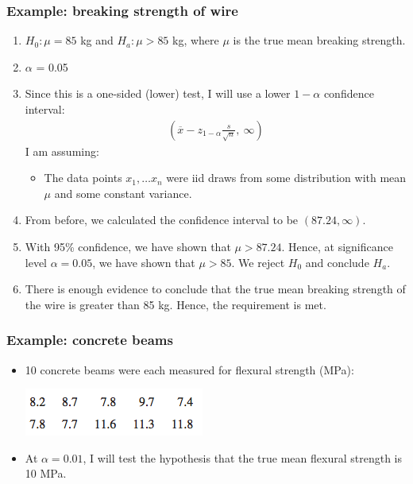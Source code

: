 \documentclass[handout]{beamer}\usepackage[]{graphicx}\usepackage[]{color}
\providecommand{\ov}[1]{\overline{#1}}
\numberwithin{equation}{section}
\begin{document}
\begin{frame}
\frametitle{Example: breaking strength of wire} \scriptsize
\begin{enumerate}[1. ]
\item $H_0: \mu = 85$ kg and $H_a: \mu > 85$ kg, where $\mu$ is the true mean breaking strength.
\pause \item $\alpha$ = 0.05
\pause \item Since this is a one-sided (lower) test, I will use a lower $1 - \alpha$ confidence interval:
\pause \begin{align*}
\left (\ov{x} - z_{1 - \alpha} \frac{s}{\sqrt{n}}, \ \infty \right )
\end{align*}
\pause I am assuming:
\pause \begin{itemize}
\pause \item The data points $x_1, \ldots x_n$ were iid draws from some distribution with mean $\mu$ and some constant variance.
\end{itemize}
\pause \item From before, we calculated the confidence interval to be $(87.24, \infty)$.
\pause \item With 95\% confidence, we have shown that $\mu > 87.24$. Hence, at significance level $\alpha = 0.05$, we have shown that $\mu > 85$. We reject $H_0$ and conclude $H_a$.
\pause \item There is enough evidence to conclude that the true mean breaking strength of the wire is greater than 85 kg. Hence, the requirement is met.
\end{enumerate}
\end{frame}

\begin{frame}
\frametitle{Example: concrete beams}
\begin{itemize}
\item 10 concrete beams were each measured for flexural strength (MPa):
\begin{center}
 \includegraphics{../../fig/fbeams.png}
\end{center}
\item At $\alpha = 0.01$, I will test the hypothesis that the true mean flexural strength is 10 MPa.
\end{itemize}
\end{frame}
\end{document}
